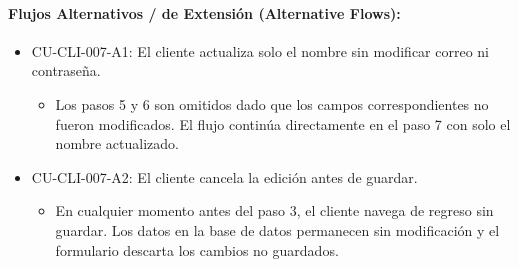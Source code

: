 \paragraph{Flujos Alternativos / de Extensión (Alternative Flows):}
\begin{itemize}
    \item CU-CLI-007-A1: El cliente actualiza solo el nombre sin modificar correo ni contraseña.
    \begin{itemize}
        \item Los pasos 5 y 6 son omitidos dado que los campos correspondientes no fueron modificados. El flujo continúa directamente en el paso 7 con solo el nombre actualizado.
    \end{itemize}
    \item CU-CLI-007-A2: El cliente cancela la edición antes de guardar.
    \begin{itemize}
        \item En cualquier momento antes del paso 3, el cliente navega de regreso sin guardar. Los datos en la base de datos permanecen sin modificación y el formulario descarta los cambios no guardados.
    \end{itemize}
\end{itemize}


